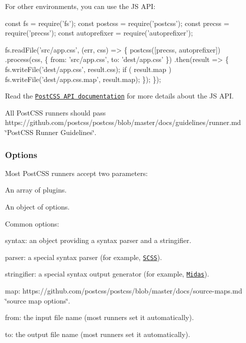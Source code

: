 For other environments, you can use the JS A\+PI\+:


\begin{DoxyCode}
const fs = require('fs');
const postcss = require('postcss');
const precss = require('precss');
const autoprefixer = require('autoprefixer');

fs.readFile('src/app.css', (err, css) => \{
    postcss([precss, autoprefixer])
        .process(css, \{ from: 'src/app.css', to: 'dest/app.css' \})
        .then(result => \{
            fs.writeFile('dest/app.css', result.css);
            if ( result.map ) fs.writeFile('dest/app.css.map', result.map);
        \});
\});
\end{DoxyCode}


Read the \href{http://api.postcss.org/postcss.html}{\tt Post\+C\+SS A\+PI documentation} for more details about the JS A\+PI.

All Post\+C\+SS runners should pass https\+://github.com/postcss/postcss/blob/master/docs/guidelines/runner.\+md \char`\"{}\+Post\+C\+S\+S Runner Guidelines\char`\"{}.

\subsubsection*{Options}

Most Post\+C\+SS runners accept two parameters\+:


\begin{DoxyItemize}
\item An array of plugins.
\item An object of options.
\end{DoxyItemize}

Common options\+:


\begin{DoxyItemize}
\item {\ttfamily syntax}\+: an object providing a syntax parser and a stringifier.
\item {\ttfamily parser}\+: a special syntax parser (for example, \href{https://github.com/postcss/postcss-scss}{\tt S\+C\+SS}).
\item {\ttfamily stringifier}\+: a special syntax output generator (for example, \href{https://github.com/ben-eb/midas}{\tt Midas}).
\item {\ttfamily map}\+: https\+://github.com/postcss/postcss/blob/master/docs/source-\/maps.\+md \char`\"{}source map options\char`\"{}.
\item {\ttfamily from}\+: the input file name (most runners set it automatically).
\item {\ttfamily to}\+: the output file name (most runners set it automatically).
\end{DoxyItemize}

